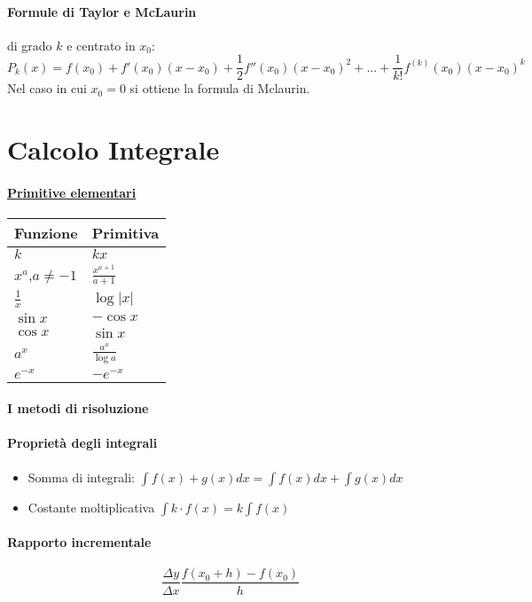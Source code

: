 \documentclass[12pt, a4paper]{article}
\begin{document}
\paragraph*{Formule di Taylor e McLaurin} di grado $k$ e centrato in $x_0$:
$$P_k(x)=f(x_0)+f'(x_0)(x-x_0) + \frac{1}{2}f''(x_0)(x-x_0)^2 +... + \frac{1}{k!}f^{(k)}(x_0)(x-x_0)^k$$
Nel caso in cui $x_0=0$ si ottiene la formula di Mclaurin.



\section*{Calcolo Integrale}
\paragraph*{\underline{Primitive elementari}}
\begin{tabularx}{0.7\textwidth}{ |Y|Y| }
	\hline
	\textbf{Funzione} & \textbf{Primitiva}    \\
	\hline
	$k$               & $kx$                  \\
	$x^a$,$a\neq-1$   & $\frac{x^{a+1}}{a+1}$ \\
	$\frac{1}{x}$     & $\log|x|$             \\
	$\sin x$          & $-\cos x$             \\
	$\cos x $         & $\sin x$              \\
	$a^x$             & $\frac{a^x}{\log a}$  \\
	\hline
	$e^{-x}$          & $-e^{-x}$             \\
	\hline
\end{tabularx}
\paragraph*{I metodi di risoluzione}
\paragraph*{Proprietà degli integrali}
\begin{itemize}
	\item Somma di integrali: $\int f(x)+g(x) dx = \int f(x) dx + \int g(x) dx$
	\item Costante moltiplicativa $\int k \cdot f(x) = k \int f(x)$
\end{itemize}

\paragraph*{Rapporto incrementale}
$$\frac{\Delta y}{ \Delta x}\frac{f(x_0+h)-f(x_0)}{h} $$
\end{document}
